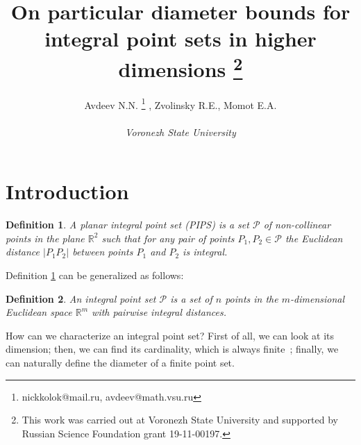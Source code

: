\documentclass[12pt]{article}
\theoremstyle{theorem}
\theoremstyle{dfn}
\newtheorem{dfn}{Definition}
\theoremstyle{remark}
\begin{document}






\title{
	On particular diameter bounds for integral point sets in higher dimensions
	\footnote{
		This work was carried out at Voronezh State University and supported by Russian Science
		Foundation grant 19-11-00197.
	}
}

\author{
	Avdeev N.N.
	\footnote{nickkolok@mail.ru, avdeev@math.vsu.ru}
	, Zvolinsky R.E., Momot E.A.
	\\
	\\
	\emph{Voronezh State University}
}

\maketitle


\section{Introduction}



\begin{dfn}\label{dfn1}
	A planar integral point set (PIPS) is a set $\mathcal{P}$
	of non-collinear points in the plane $\mathbb{R}^{2}$ such that
	for any pair of points $P_{1}, P_{2} \in \mathcal{P}$
	the Euclidean distance $|P_{1}P_{2}|$
	between points $P_{1}$ and $P_{2}$ is integral.
\end{dfn}

Definition \ref{dfn1} can be generalized as follows:

\begin{dfn}
	An integral point set $\mathcal{P}$ is a set of $n$ points in
	the $m$-dimensional Euclidean space $\mathbb{R}^{m}$ with pairwise
	integral distances.
\end{dfn}

How can we characterize an integral point set?
First of all, we can look at its dimension;
then, we can find its cardinality, which is always finite~\cite{anning1945integral,erdos1945integral};
finally, we can naturally %
define the diameter of a finite point set.
\end{document}
